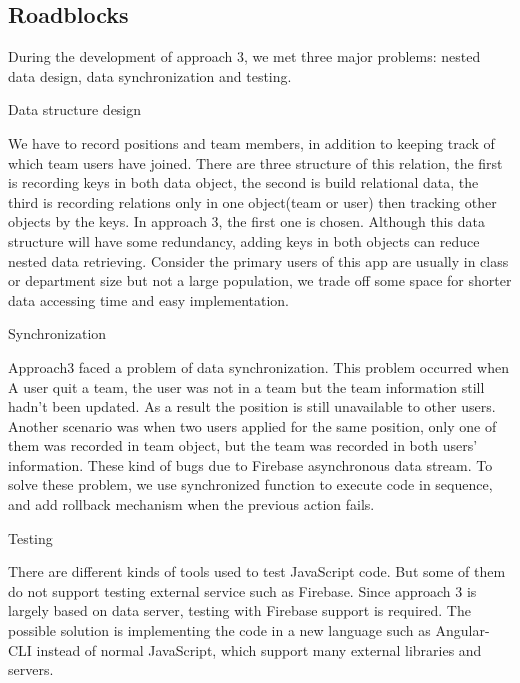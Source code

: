 \documentclass[conference]{IEEEtran}
\begin{document}
\subsection{Roadblocks}
During the development of approach 3, we met three major problems: nested data design, data synchronization and testing.

Data structure design

We have to record positions and team members, in addition to keeping track of which team users have joined. There are three structure of this relation, the first is recording keys in both data object, the second is build relational data, the third is recording relations only in one object(team or user) then tracking other objects by the keys. In approach 3, the first one is chosen. Although this data structure will have some redundancy, adding keys in both objects can reduce nested data retrieving. Consider the primary users of this app are usually in class or department size but not a large population, we trade off some space for shorter data accessing time and easy implementation.

Synchronization

Approach3 faced a problem of data synchronization. This problem occurred when A user quit a team, the user was not in a team but the team information still hadn't been updated. As a result the position is still unavailable to other users. Another scenario was when two users applied for the same position, only one of them was recorded in team object, but the team was recorded in both users' information. These kind of bugs due to Firebase asynchronous data stream. To solve these problem, we use synchronized function to execute code in sequence, and add rollback mechanism when the previous action fails.

Testing

There are different kinds of tools used to test JavaScript code. But some of them do not support testing external service such as Firebase. Since approach 3 is largely based on data server, testing with Firebase support is required. The possible solution is implementing the code in a new language such as Angular-CLI instead of normal JavaScript, which support many external libraries and servers.
\end{document}
